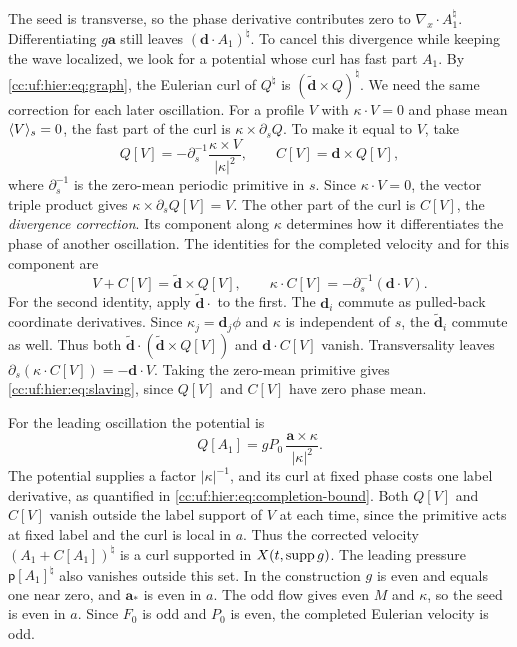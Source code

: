 The seed is transverse, so the phase derivative contributes zero to
$\nabla_x\cdot A_1^\natural$. Differentiating $g\mathbf a$ still leaves
$(\mathbf d\cdot A_1)^\natural$. To cancel this divergence while keeping
the wave localized, we look for a potential whose curl has fast part $A_1$.
By \eqref{cc:uf:hier:eq:graph}, the Eulerian curl of $Q^\natural$ is
$(\widetilde{\mathbf d}\times Q)^\natural$. We need the same correction for each later
oscillation. For a profile $V$ with $\kappa\cdot V=0$ and phase mean
$\langle V\rangle_s=0$, the fast part of the curl is $\kappa\times\partial_s Q$.
To make it equal to $V$, take
\begin{equation}\label{cc:uf:hier:eq:completion}
 Q[V]=-\partial_s^{-1}\frac{\kappa\times V}{|\kappa|^2},
 \qquad C[V]=\mathbf d\times Q[V],
\end{equation}
where $\partial_s^{-1}$ is the zero-mean periodic primitive in $s$.
Since $\kappa\cdot V=0$, the vector triple product gives
$\kappa\times\partial_s Q[V]=V$. The other part of the curl is $C[V]$,
the \emph{divergence correction}. Its component along $\kappa$ determines
how it differentiates the phase of another oscillation. The identities
for the completed velocity and for this component are
\begin{equation}\label{cc:uf:hier:eq:slaving}
 V+C[V]=\widetilde{\mathbf d}\times Q[V],\qquad
 \kappa\cdot C[V]=-\partial_s^{-1}(\mathbf d\cdot V).
\end{equation}
For the second identity, apply $\widetilde{\mathbf d}\cdot$ to the first.
The $\mathbf d_i$ commute as pulled-back coordinate derivatives. Since
$\kappa_j=\mathbf d_j\phi$ and $\kappa$ is independent of $s$, the
$\widetilde{\mathbf d}_i$ commute as well. Thus both
$\widetilde{\mathbf d}\cdot(\widetilde{\mathbf d}\times Q[V])$ and
$\mathbf d\cdot C[V]$ vanish. Transversality leaves
$\partial_s(\kappa\cdot C[V])=-\mathbf d\cdot V$. Taking the zero-mean
primitive gives \eqref{cc:uf:hier:eq:slaving}, since $Q[V]$ and $C[V]$
have zero phase mean.

For the leading oscillation the potential is
\[
 Q[A_1]=gP_0\,\frac{\mathbf a\times\kappa}{|\kappa|^2}.
\]
The potential supplies a factor $|\kappa|^{-1}$, and its curl at fixed
phase costs one label derivative, as quantified in \eqref{cc:uf:hier:eq:completion-bound}.
Both $Q[V]$ and $C[V]$ vanish outside the label support of $V$ at each
time, since the primitive acts at fixed label and the curl is local in $a$.
Thus the corrected velocity $(A_1+C[A_1])^\natural$ is a curl supported
in $X(t,\operatorname{supp} g)$. The leading pressure $\mathsf p[A_1]^\natural$ also
vanishes outside this set.
In the construction $g$ is even and equals one near zero,
and $\mathbf a_*$ is even in $a$. The odd flow gives even $M$ and
$\kappa$, so the seed is even in $a$. Since $F_0$ is odd and $P_0$ is
even, the completed Eulerian velocity is odd.

